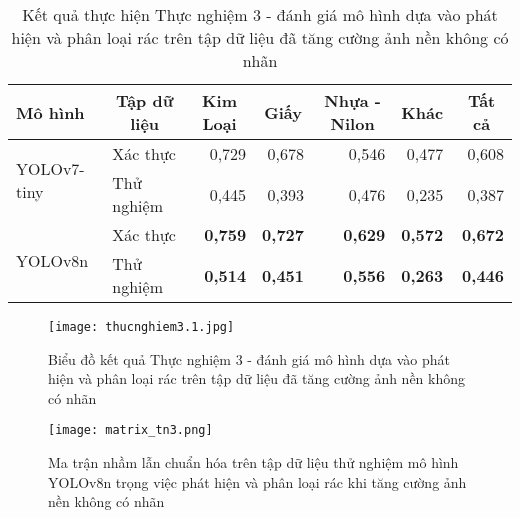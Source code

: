 \documentclass[../the.tex]{subfiles}
\begin{document}
\begin{table}[h!]
    \centering
    \caption{Kết quả thực hiện Thực nghiệm 3 - đánh giá mô hình dựa vào phát hiện và phân loại rác trên tập dữ liệu đã tăng cường ảnh nền không có nhãn}
    \begin{tabular}{|l|l|r|r|r|r|r|}
        \hline
        \textbf{Mô hình}             & \multicolumn{1}{c|}{\textbf{Tập dữ liệu}} & \multicolumn{1}{c|}{\textbf{Kim Loại}} & \multicolumn{1}{c|}{\textbf{Giấy}} & \multicolumn{1}{c|}{\textbf{Nhựa - Nilon}} & \multicolumn{1}{c|}{\textbf{Khác}} & \multicolumn{1}{c|}{\textbf{Tất cả}} \\ \hline
        \multirow{2}{*}{YOLOv7-tiny} & Xác thực                                  & 0,729                                  & 0,678                              & 0,546                                      & 0,477                              & 0,608                                \\ \cline{2-7}
                                     & Thử nghiệm                                & 0,445                                  & 0,393                              & 0,476                                      & 0,235                              & 0,387                                \\ \hline
        \multirow{2}{*}{YOLOv8n}     & Xác thực                                  & \textbf{0,759}                         & \textbf{0,727}                     & \textbf{0,629}                             & \textbf{0,572}                     & \textbf{0,672}                       \\ \cline{2-7}
                                     & Thử nghiệm                                & \textbf{0,514}                         & \textbf{0,451}                     & \textbf{0,556}                             & \textbf{0,263}                     & \textbf{0,446}                       \\ \hline
    \end{tabular}
    \label{tab:thucnghiem3.1}
\end{table}

\begin{figure}[H]
    \centering
    \texttt{[image: thucnghiem3.1.jpg]}
    \caption{Biểu đồ kết quả Thực nghiệm 3 - đánh giá mô hình dựa vào phát hiện và phân loại rác trên tập dữ liệu đã tăng cường ảnh nền không có nhãn}
    \label{fig:thucnghiem3}
\end{figure}

\begin{figure}[H]
    \centering
    \texttt{[image: matrix\_tn3.png]}
    \caption{Ma trận nhầm lẫn chuẩn hóa trên tập dữ liệu thử nghiệm mô hình YOLOv8n trọng việc phát hiện và phân loại rác khi tăng cường ảnh nền không có nhãn}
    \label{fig:thucnghiem3.1}
\end{figure}
\end{document}

